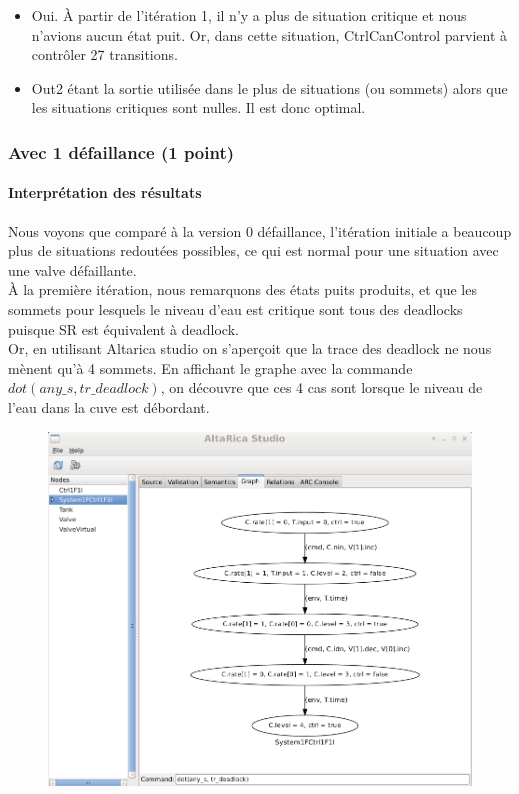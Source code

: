 \documentclass[a4paper]{book}
\begin{document}
\begin{itemize}
	\item Oui. À partir de l'itération 1, il n'y a plus de situation critique et nous n'avions aucun état puit. Or, dans cette situation, CtrlCanControl parvient à contrôler 27 transitions.
	\item Out2 étant la sortie utilisée dans le plus de situations (ou sommets) alors que les situations critiques sont nulles. Il est donc optimal.

\end{itemize}

\subsubsection{Avec 1 défaillance (1 point)}





\paragraph{Interprétation des résultats}

Nous voyons que comparé à la version 0 défaillance, l'itération initiale a beaucoup plus de situations redoutées possibles, ce qui est normal pour une situation avec une valve défaillante. \\
À la première itération, nous remarquons des états puits produits, et que les sommets pour lesquels le niveau d'eau est critique sont tous des deadlocks puisque SR est équivalent à deadlock. \\ 
Or, en utilisant Altarica studio on s'aperçoit que la trace des deadlock ne nous mènent qu'à 4 sommets. En affichant le graphe avec la commande $dot(any\_s, tr\_deadlock)$, on découvre que ces 4 cas sont lorsque le niveau de l'eau dans la cuve est débordant.

\begin{figure}[H]
  \centering
  \includegraphics[width=14cm]{img/CtrlF1I1.png}
\end{figure}
\end{document}
